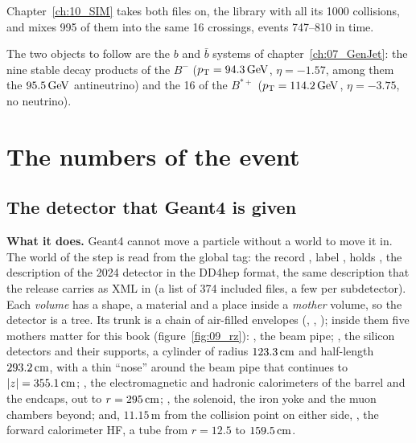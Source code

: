 Chapter~\ref{ch:10_SIM} takes both files on, the library with all its 1000 collisions, and mixes 995 of them into
the same 16 crossings, events 747--810 in time.

The two objects to follow are the $b$ and $\bar b$ systems of chapter~\ref{ch:07_GenJet}: the nine stable
decay products of the $B^-$ ($p_{\mathrm{T}}=94.3\,\mathrm{GeV}$, $\eta=-1.57$, among them the $95.5\,\mathrm{GeV}$ antineutrino) and the
16 of the $B^{*+}$ ($p_{\mathrm{T}}=114.2\,\mathrm{GeV}$, $\eta=-3.75$, no neutrino).

\section{The numbers of the event}
\label{sec:09_numbers}

\subsection{The detector that Geant4 is given}
\label{sec:09_detector}

\textbf{What it does.} Geant4 cannot move a particle without a world to move it in. The world of the 
step is read from the global tag: the record , label , holds
, the description of the 2024 detector in the DD4hep format, the same description
that the release carries as XML in  (a list of
374 included files, a few per subdetector). Each \emph{volume} has a shape, a material and a place inside a
\emph{mother} volume, so the detector is a tree. Its trunk is a chain of air-filled envelopes (, ,
); inside them five mothers matter for this book (figure~\ref{fig:09_rz}): , the beam pipe;
, the silicon detectors and their supports, a cylinder of radius $123.3\,\mathrm{cm}$ and half-length
$293.2\,\mathrm{cm}$, with a thin ``nose'' around the beam pipe that continues to $|z|=355.1\,\mathrm{cm}$; , the
electromagnetic and hadronic calorimeters of the barrel and the endcaps, out to $r=295\,\mathrm{cm}$; , the
solenoid, the iron yoke and the muon chambers beyond; and, $11.15$\,m from the collision point on either side,
, the forward calorimeter HF, a tube from $r=12.5$ to $159.5\,\mathrm{cm}$.

